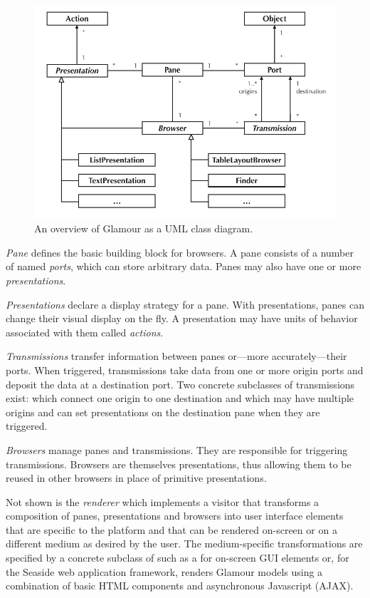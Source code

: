 \documentclass[a4paper,10pt,twoside]{book}
\begin{document}
\begin{figure}[htbp]
\centerline{\includegraphics[width=\linewidth]{class_diagram.pdf}}
\caption{An overview of Glamour as a UML class diagram.}
\label{fig:uml-overview}
\end{figure}

\emph{Pane} defines the basic building block for browsers. A pane
consists of a number of named \emph{ports}, which can store arbitrary
data. Panes may also have one or more \emph{presentations}.

\emph{Presentations} declare a display strategy for a pane. With
presentations, panes can change their visual display on the fly. A
presentation may have units of behavior associated with them called
\emph{actions}.

\emph{Transmissions} transfer information between panes or---more accurately---their ports. When triggered, transmissions take data from one or more origin ports and deposit the data at a destination port. Two concrete subclasses of transmissions exist:  which connect one origin to one destination and  which may have multiple origins and can set presentations on the destination pane when they are triggered.

\emph{Browsers} manage panes and transmissions. They are responsible for triggering transmissions. Browsers are themselves presentations, thus allowing them to be reused in other browsers in place of primitive presentations.

Not shown is the \emph{renderer} which implements a visitor that
transforms a composition of panes, presentations and browsers into
user interface elements that are specific to the platform and that can
be rendered on-screen or on a different medium as desired by the
user. The medium-specific transformations are specified by a concrete
subclass of  such as a  for
on-screen GUI elements or, for the Seaside web application framework,
 renders Glamour models using a combination of basic
HTML components and asynchronous Javascript (AJAX).
\end{document}
